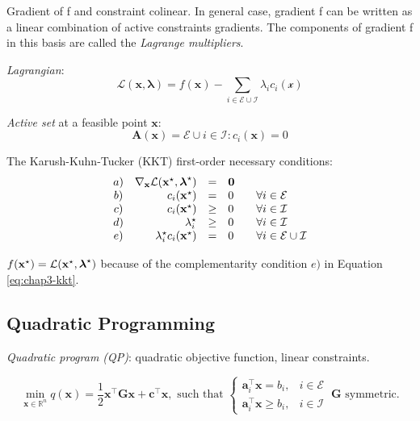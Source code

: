 Gradient of f and constraint colinear. In general case, gradient f can
be written as a linear combination of active constraints gradients. The
components of gradient f in this basis are called the \emph{Lagrange
  multipliers}.

\emph{Lagrangian}:
\begin{equation}
\mathcal{L}(\mathbf{x},\boldsymbol{\lambda}) =
f(\mathbf{x})-\sum_{i\in\mathcal{E}\cup\mathcal{I}}
\lambda_ic_i(\mathcal{x})
\end{equation}

\emph{Active set} at a feasible point $\mathbf{x}$:
\begin{equation}
\mathbf{A}(\mathbf{x})=\mathcal{E}\cup{i \in \mathcal{I}:
  c_i(\mathbf{x})=0}
\end{equation}

The Karush-Kuhn-Tucker (KKT) first-order necessary conditions:
\begin{equation}
\label{eq:chap3-kkt}
\begin{array}{crcl}
a) & \nabla_{\mathbf{x}}\mathcal{L}(\argmin{x}, \boldsymbol{\lambda}^\star) & = & \mathbf{0} \\%
b) & c_i(\argmin{x}) & = & 0 \qquad \forall i \in \mathcal{E} \\%
c) & c_i(\argmin{x}) & \ge & 0 \qquad \forall i \in \mathcal{I}\\%
d) & \lambda_i^{\star} & \ge & 0 \qquad \forall i \in \mathcal{I}\\%
e) & \lambda_i^{\star} c_i(\argmin{x}) & = & 0 \qquad \forall i \in \mathcal{E}\cup\mathcal{I}%
\end{array}
\end{equation}

$f(\mathbf{x}^{\star}) = \mathcal{L}(\mathbf{x}^{\star}, \boldsymbol{\lambda}^\star)$ because of
the complementarity condition $e)$ in Equation \ref{eq:chap3-kkt}.

\subsection{Quadratic Programming}

\emph{Quadratic program (QP)}: quadratic objective function, linear
constraints.

\begin{equation}
\label{eq:chap3-qp}
\min_{\mathbf{x} \in \mathbb R^n}
q(\mathbf{x})=\frac{1}{2}\mathbf{x}^{\top}\mathbf{G}\mathbf{x}
+\mathbf{c}^{\top}\mathbf{x},\text{ such that }
\left\{\begin{array}{cc}
\mathbf{a}_i^{\top}\mathbf{x} = b_i, & i \in \mathcal{E} \\%
\mathbf{a}_i^{\top}\mathbf{x} \ge b_i, & i \in \mathcal{I} %
\end{array}\right. ~\mathbf{G}\text{ symmetric.}
\end{equation}

